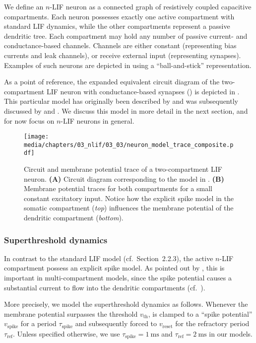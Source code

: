 We define an $n$-LIF neuron as a connected graph of resistively coupled capacitive compartments.
Each neuron possesses exactly one active compartment with standard LIF dynamics, while the other compartments represent a passive dendritic tree.
Each compartment may hold any number of passive current- and conductance-based channels.
Channels are either constant (representing bias currents and leak channels), or receive external input (representing synapses).
Examples of such neurons are depicted in  using a \enquote{ball-and-stick} representation.

As a point of reference, the expanded equivalent circuit diagram of the two-compartment LIF neuron with conductance-based synapses () is depicted in .
This particular model has originally been described by \citet{vu1993mechanism} and was subsequently discussed by \citet{koch1999biophysics} and \citet{capaday2006direct}.
We discuss this model in more detail in the next section, and for now focus on $n$-LIF neurons in general.

\begin{figure}
	\texttt{[image: media/chapters/03\_nlif/03\_03/neuron\_model\_trace\_composite.pdf]}%
	{\label{fig:two_comp_lif_circuit}}
	{\label{fig:two_comp_lif_trace}}
	\caption[Circuit and membrane potential trace of a two-compartment LIF neuron]{Circuit and membrane potential trace of a two-compartment LIF neuron.
	\textbf{(A)} Circuit diagram corresponding to the model in .
	\textbf{(B)} Membrane potential traces for both compartments for a small constant excitatory input.
	Notice how the explicit spike model in the somatic compartment (\emph{top}) influences the membrane potential of the dendritic compartment (\emph{bottom}).}
	\label{fig:two_comp_lif}
\end{figure}

\subsubsection{Superthreshold dynamics}
In contrast to the standard LIF model (cf.~Section~2.2.3), the active $n$-LIF compartment possess an explicit spike model.
As pointed out by \citet{capaday2006direct}, this is important in multi-compartment models, since the spike potential causes a substantial current to flow into the dendritic compartments (cf.~).

More precisely, we model the superthreshold dynamics as follows.
Whenever the membrane potential \vMem surpasses the threshold $v_\mathrm{th}$, \vMem is clamped to a \enquote{spike potential} $v_\mathrm{spike}$ for a period $\tau_\mathrm{spike}$ and subsequently forced to $v_\mathrm{reset}$ for the refractory period $\tau_\mathrm{ref}$.
Unless specified otherwise, we use $\tau_\mathrm{spike} = \SI{1}{\milli\second}$ and $\tau_\mathrm{ref} = \SI{2}{\milli\second}$ in our models.

